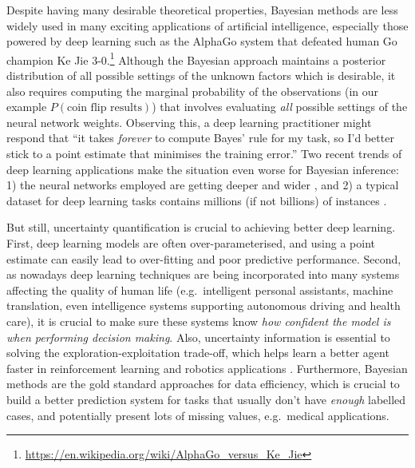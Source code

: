 Despite having many desirable theoretical properties, Bayesian methods are less widely used in many exciting applications of artificial intelligence, especially those powered by deep learning \citep{lecun:deeplearning2015, schmidhuber:deeplearning2015, goodfellow:deeplearning2016} such as the AlphaGo system \citep{silver:alphago2016, silver:alphagozero2017} that defeated human Go champion Ke Jie 3-0.\footnote{\url{https://en.wikipedia.org/wiki/AlphaGo_versus_Ke_Jie}}
%
Although the Bayesian approach maintains a posterior distribution of all possible settings of the unknown factors which is desirable, it also requires computing the marginal probability of the observations (in our example $P(\text{coin flip results})$) that involves evaluating \emph{all} possible settings of the neural network weights. Observing this, a deep learning practitioner might respond that ``it takes \emph{forever} to compute Bayes' rule for my task, so I'd better stick to a point estimate that minimises the training error.'' Two recent trends of deep learning applications make the situation even worse for Bayesian inference: 1) the neural networks employed are getting deeper and wider \citep{he:resnet2016, huang:stochastic_depth2016, huang:dense_net2017}, and 2) a typical dataset for deep learning tasks contains millions (if not billions) of instances \citep{deng:imagenet2009, abu:youtube8m2016}.

%

But still, uncertainty quantification is crucial to achieving better deep learning. First, deep learning models are often over-parameterised, and using a point estimate can easily lead to over-fitting and poor predictive performance. Second, as nowadays deep learning techniques are being incorporated into many systems affecting the quality of human life (e.g.~intelligent personal assistants, machine translation, even intelligence systems supporting autonomous driving and health care), it is crucial to make sure these systems know \emph{how confident the model is when performing decision making}. Also, uncertainty information is essential to solving the exploration-exploitation trade-off, which helps learn a better agent faster in reinforcement learning and robotics applications \citep{deisenroth:pilco2011, mcallister:data_efficientRL2016}. Furthermore, Bayesian methods are the gold standard approaches for data efficiency, which is crucial to build a better prediction system for tasks that usually don't have \emph{enough} labelled cases, and potentially present lots of missing values, e.g.~medical applications.  

